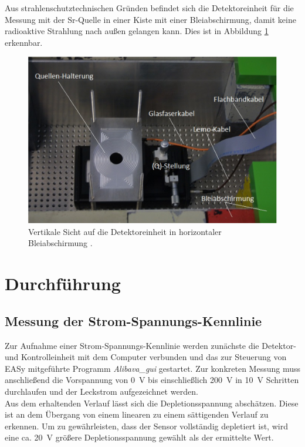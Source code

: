Aus strahlenschutztechnischen Gründen befindet sich die Detektoreinheit für die Messung mit der Sr-Quelle in einer Kiste mit einer Bleiabschirmung, damit keine radioaktive Strahlung nach außen gelangen kann. Dies ist in Abbildung \ref{fig:quell} erkennbar.
\begin{figure}[htb]
  \centering
  \includegraphics{graphics/Abschirmung.png}
  \caption{Vertikale Sicht auf die Detektoreinheit in horizontaler Bleiabschirmung \cite{anleitung}.}
  \label{fig:quell}
\end{figure}

\FloatBarrier
\section{Durchführung}
\label{sec:Durchführung}

\subsection{Messung der Strom-Spannungs-Kennlinie}
\label{sec:Kennlinie}
Zur Aufnahme einer Strom-Spannungs-Kennlinie werden zunächste die Detektor- und Kontrolleinheit mit dem Computer verbunden und das zur Steuerung von EASy mitgeführte Programm \textit{Alibava\_gui} gestartet. Zur konkreten Messung muss anschließend die Vorspannung von \SI{0}{\volt} bis einschließlich \SI{200}{\volt} in \SI{10}{\volt} Schritten durchlaufen und der Leckstrom aufgezeichnet werden.\\
Aus dem erhaltenden Verlauf lässt sich die Depletionsspannung abschätzen. Diese ist an dem Übergang von einem linearen zu einem sättigenden Verlauf zu erkennen. Um zu gewährleisten, dass der Sensor vollständig depletiert ist, wird eine ca. \SI{20}{\volt} größere Depletionsspannung gewählt als der ermittelte Wert.

